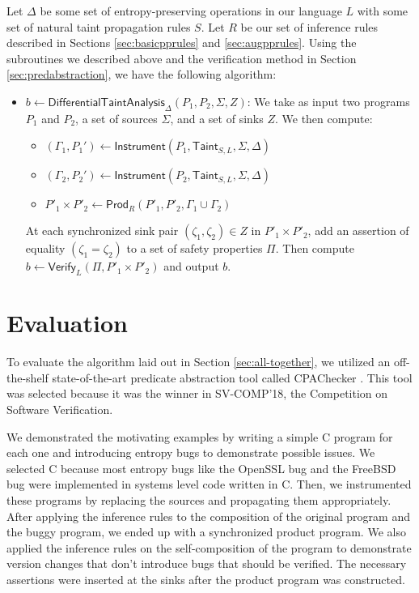 \documentclass[letterpaper,twocolumn,10pt]{article}
\begin{document}
Let $\Delta$ be some set of entropy-preserving operations in our language $L$ with some set of 
natural taint propagation rules $S$.
Let $R$ be our set of inference rules described in Sections \ref{sec:basicpprules} and \ref{sec:augpprules}.
Using the subroutines we described above and the verification method in Section
\ref{sec:predabstraction}, we have the following algorithm:

\begin{itemize}
    \item $b \gets \mathsf{DifferentialTaintAnalysis}_\Delta(P_1, P_2, \Sigma, Z)$: We take 
    as input two programs $P_1$ and $P_2$, a set of sources $\Sigma$, and a set of 
    sinks $Z$. We then compute:
    \begin{itemize}
        \item $(\Gamma_1, P_1') \gets \mathsf{Instrument}(P_1, \mathsf{Taint}_{S,L}, \Sigma, \Delta)$
        \item $(\Gamma_2, P_2') \gets \mathsf{Instrument}(P_2, \mathsf{Taint}_{S,L}, \Sigma, \Delta)$
        \item $P'_1 \times P'_2 \gets \mathsf{Prod}_R(P'_1, P'_2, \Gamma_1 \cup \Gamma_2)$
    \end{itemize}
    At each synchronized sink pair $(\zeta_1, \zeta_2) \in Z$ in $P'_1 \times P'_2$, add an assertion of equality 
    $(\zeta_1 = \zeta_2)$ to a set of safety properties $\Pi$. Then compute $b \gets \mathsf{Verify}_{L}(\Pi, P'_1 \times P'_2)$
    and output $b$.
\end{itemize}

\section{Evaluation}
\label{sec:eval}

To evaluate the algorithm laid out in Section \ref{sec:all-together}, we utilized an off-the-shelf state-of-the-art predicate abstraction tool called CPAChecker \cite{beyer2011cpachecker}. This tool was selected because it was the winner in SV-COMP'18, the Competition on Software Verification. 

We demonstrated the motivating examples by writing a simple C program for each one and introducing entropy bugs to demonstrate possible issues. We selected C because most entropy bugs like the OpenSSL bug and the FreeBSD bug were implemented in systems level code written in C. Then, we instrumented these programs by replacing the sources and propagating them appropriately. After applying the inference rules to the composition of the original program and the buggy program, we ended up with a synchronized product program. We also applied the inference rules on the self-composition of the program to demonstrate version changes that don't introduce bugs that should be verified. The necessary assertions were inserted at the sinks after the product program was constructed.
\end{document}
